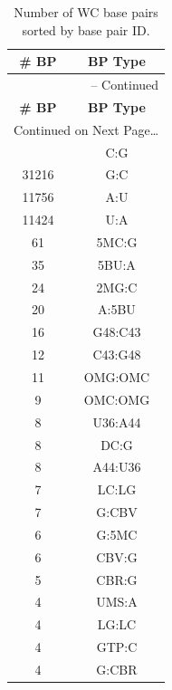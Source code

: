 \begin{center}
\begin{longtable}{c|c}
\caption{Number of WC base pairs sorted by base pair ID.}
\label{tab:allWC}\\ 
\bf{\# BP} & \bf{BP Type} \\ \hline \hline 
\endfirsthead

\multicolumn{2}{r}{{\tablename} \thetable{} -- Continued} \\
\bf{\# BP} & \bf{BP Type} \\ \hline \hline
\endhead

\multicolumn{2}{r}{Continued on Next Page\ldots} \\
\endfoot
\endlastfoot
  33036 & C:G      \\ \hline
  31216 & G:C      \\ \hline
  11756 & A:U      \\ \hline
  11424 & U:A      \\ \hline
     61 & 5MC:G    \\ \hline
     35 & 5BU:A    \\ \hline
     24 & 2MG:C    \\ \hline
     20 & A:5BU    \\ \hline
     16 & G48:C43  \\ \hline
     12 & C43:G48  \\ \hline
     11 & OMG:OMC  \\ \hline
      9 & OMC:OMG  \\ \hline
      8 & U36:A44  \\ \hline
      8 & DC:G     \\ \hline
      8 & A44:U36  \\ \hline
      7 & LC:LG    \\ \hline
      7 & G:CBV    \\ \hline
      6 & G:5MC    \\ \hline
      6 & CBV:G    \\ \hline
      5 & CBR:G    \\ \hline
      4 & UMS:A    \\ \hline
      4 & LG:LC    \\ \hline
      4 & GTP:C    \\ \hline
      4 & G:CBR    \\ \hline

\end{longtable}
\end{center}
